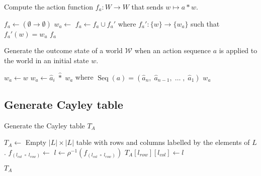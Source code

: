 \begin{algorithm}[H]
\caption{Compute the action function $f_{a}: W \to W$ that sends $w \mapsto a \ast w$.}
\hrulefill
\begin{algorithmic}[1]
    \State $f_{a} \gets (\emptyset \to \emptyset)$
        \State $w_{a} \gets$ 
        \State $f_{a} \gets f_{a} \cup f_{a}'$ where $f_{a}': \{w\} \to \{w_{a}\}$ such that $f_{a}'(w) = w_{a}$
    \EndFor
    \State \Return $f_{a}$
\EndProcedure
\end{algorithmic}
\end{algorithm}


\begin{algorithm}[H]
\caption{
Generate the outcome state of a world $\mathscr{W}$ when an action sequence $a$ is applied to the world in an initial state $w$.
}
\label{alg:GenerateActionOutcome}
\hrulefill
\begin{algorithmic}[1]
    \State $w_{a} \gets w$
        \State $w_{a} \gets \hat{a}_{i} \; \hat{\ast} \; w_{a}$ where $\operatorname{Seq}(a) = (\hat{a}_n, \; \hat{a}_{n-1}, \; \dots \;, \; \hat{a}_1)$
    \EndFor
    \State \Return $w_{a}$
\EndProcedure
\end{algorithmic}
\end{algorithm}


\subsection{Generate Cayley table}

\begin{algorithm}[H]
\caption{
Generate the Cayley table $T_{A}$
}
\hrulefill
\begin{algorithmic}[1]
    \State $T_{A} \gets$ Empty $|L| \times |L|$ table with rows and columns labelled by the elements of $L$.
    \Statex {}
            \Statex {}
            \State $f_{(l_{col} \; \circ \; l_{row})} \gets$ 
            \State $l \gets \rho^{-1}(f_{(l_{col} \; \circ \; l_{row})})$
            \State $T_{A}[l_{row}][l_{col}] \gets l$

            
        \EndFor
    \EndFor
    
    \State \Return $T_{A}$
\EndProcedure
\end{algorithmic}
\end{algorithm}



